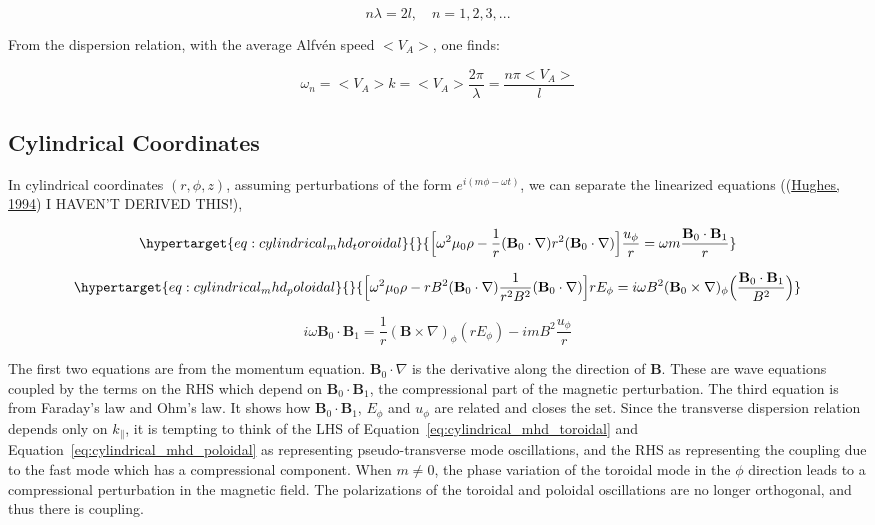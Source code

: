 \documentclass[
  notoc %
]{tufte-book}
\begin{document}
\[
n\lambda = 2l,\quad n = 1,2,3,...
\]

From the dispersion relation, with the average Alfvén speed \(<V_A>\),
one finds:

\[
\omega_n = <V_A> k = <V_A>\frac{2\pi}{\lambda} = \frac{n\pi<V_A>}{l}
\]

\hypertarget{cylindrical-coordinates}{%
\subsection{Cylindrical Coordinates}\label{cylindrical-coordinates}}

In cylindrical coordinates \((r,\phi,z)\), assuming perturbations of the
form \(e^{i(m\phi - \omega t)}\), we can separate the linearized
equations ((\protect\hyperlink{ref-hughes1994}{Hughes, 1994}) I HAVEN'T
DERIVED THIS!),

\begin{equation}\protect\hypertarget{eq:cylindrical_mhd_toroidal}{}{
\Big[ \omega^2 \mu_0 \rho - \frac{1}{r}(\mathbf{B}_0\cdot\nabla)r^2(\mathbf{B}_0\cdot\nabla) \Big]\frac{u_\phi}{r} = \omega m \frac{\mathbf{B}_0\cdot\mathbf{B}_1}{r}
}\label{eq:cylindrical_mhd_toroidal}\end{equation}

\begin{equation}\protect\hypertarget{eq:cylindrical_mhd_poloidal}{}{
\Big[\omega^2 \mu_0 \rho - rB^2 (\mathbf{B}_0\cdot\nabla)\frac{1}{r^2 B^2}(\mathbf{B}_0\cdot\nabla) \Big]rE_\phi = i\omega B^2 (\mathbf{B}_0\times\nabla)_\phi \Big( \frac{\mathbf{B}_0\cdot\mathbf{B}_1}{B^2} \Big)
}\label{eq:cylindrical_mhd_poloidal}\end{equation}

\[
i\omega \mathbf{B}_0\cdot\mathbf{B}_1 = \frac{1}{r}(\mathbf{B}\times\nabla)_\phi (rE_\phi) - imB^2\frac{u_\phi}{r}
\]

The first two equations are from the momentum equation.
\(\mathbf{B}_0\cdot\nabla\) is the derivative along the direction of
\(\mathbf{B}\). These are wave equations coupled by the terms on the RHS
which depend on \(\mathbf{B}_0\cdot\mathbf{B}_1\), the compressional
part of the magnetic perturbation. The third equation is from Faraday's
law and Ohm's law. It shows how \(\mathbf{B}_0\cdot\mathbf{B}_1\),
\(E_\phi\) and \(u_\phi\) are related and closes the set. Since the
transverse dispersion relation depends only on \(k_\parallel\), it is
tempting to think of the LHS of
Equation~\ref{eq:cylindrical_mhd_toroidal} and
Equation~\ref{eq:cylindrical_mhd_poloidal} as representing
pseudo-transverse mode oscillations, and the RHS as representing the
coupling due to the fast mode which has a compressional component. When
\(m\neq 0\), the phase variation of the toroidal mode in the \(\phi\)
direction leads to a compressional perturbation in the magnetic field.
The polarizations of the toroidal and poloidal oscillations are no
longer orthogonal, and thus there is coupling.
\end{document}
